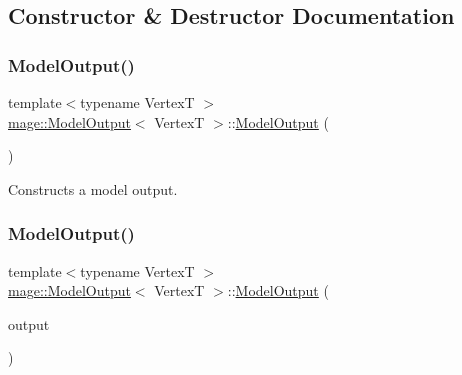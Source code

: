 \subsection{Constructor \& Destructor Documentation}
\hypertarget{structmage_1_1_model_output_a7d64b57d8207968541eb9c6da6ef0163}{}\label{structmage_1_1_model_output_a7d64b57d8207968541eb9c6da6ef0163} 
\subsubsection{\texorpdfstring{Model\+Output()}{ModelOutput()}\hspace{0.1cm}{\footnotesize\ttfamily [1/3]}}
{\footnotesize\ttfamily template$<$typename VertexT $>$ \\
\hyperlink{structmage_1_1_model_output}{mage\+::\+Model\+Output}$<$ VertexT $>$\+::\hyperlink{structmage_1_1_model_output}{Model\+Output} (\begin{DoxyParamCaption}{ }\end{DoxyParamCaption})\hspace{0.3cm}{\ttfamily [default]}}

Constructs a model output. \hypertarget{structmage_1_1_model_output_aa5f5b2ae1c2ab2827101567bb9aea0c6}{}\label{structmage_1_1_model_output_aa5f5b2ae1c2ab2827101567bb9aea0c6} 
\subsubsection{\texorpdfstring{Model\+Output()}{ModelOutput()}\hspace{0.1cm}{\footnotesize\ttfamily [2/3]}}
{\footnotesize\ttfamily template$<$typename VertexT $>$ \\
\hyperlink{structmage_1_1_model_output}{mage\+::\+Model\+Output}$<$ VertexT $>$\+::\hyperlink{structmage_1_1_model_output}{Model\+Output} (\begin{DoxyParamCaption}\item[{const \hyperlink{structmage_1_1_model_output}{Model\+Output}$<$ VertexT $>$ \&}]{output }\end{DoxyParamCaption})\hspace{0.3cm}{\ttfamily [delete]}}

